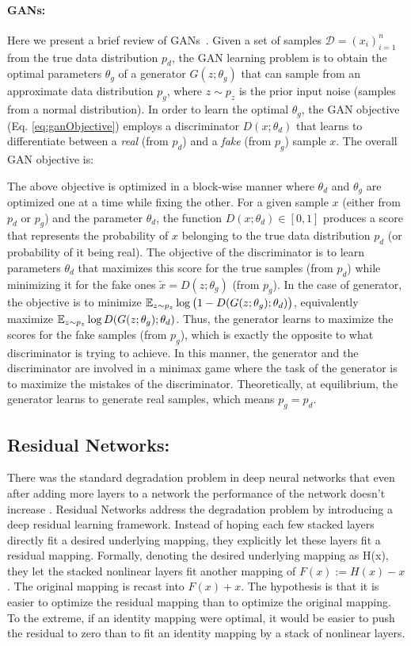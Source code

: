 \paragraph{GANs:} 
Here we present a brief review of GANs~\cite{goodfellow2014generative}. Given a set of samples $\mathcal{D} = (x_i)_{i=1}^n$ from the true data distribution $p_d$, the GAN learning problem is to obtain the optimal parameters $\theta_g$ of a generator $G(z;\theta_g)$ that can sample from an approximate data distribution $p_g$, where $z \sim p_z$ is the prior input noise (\eg samples from a normal distribution). In order to learn the optimal $\theta_g$, the GAN objective (Eq. \eqref{eq:ganObjective}) employs a discriminator $D(x; \theta_d)$ that learns to differentiate between a {\em real} (from $p_d$) and a {\em fake} (from $p_g$) sample $x$. The overall GAN objective is:


The above objective is optimized in a block-wise manner where $\theta_d$ and $\theta_g$ are optimized one at a time while fixing the other. For a given sample $x$ (either from $p_d$ or $p_g$) and the parameter $\theta_d$, the function $D(x; \theta_d) \in [0, 1]$ produces a score that represents the probability of $x$ belonging to the true data distribution $p_d$ (or probability of it being real). The objective of the discriminator is to learn parameters $\theta_d$ that maximizes this score for the true samples (from $p_d$) while minimizing it for the fake ones $\tilde{x} = D(z; \theta_g)$ (from $p_g$). In the case of generator, the objective is to minimize $\operatorname{\mathbb{E}}_{z \sim p_z}\log \big( 1 - D(G(z; \theta_g) ; \theta_d) \big)$, equivalently maximize $\operatorname{\mathbb{E}}_{z \sim p_z} \log D(G(z; \theta_g) ; \theta_d)$. Thus, the generator learns to maximize the scores for the fake samples (from $p_g$), which is exactly the opposite to what discriminator is trying to achieve. In this manner, the generator and the discriminator are involved in a minimax game where the task of the generator is to maximize the mistakes of the discriminator. Theoretically, at equilibrium, the generator learns to generate real samples, which means $p_g = p_d$.

\subsection*{Residual Networks:}
There was the standard degradation problem in deep neural networks that even after adding more layers to a network the performance of the network doesn't increase . Residual Networks\cite{he2016deep} address the degradation problem by introducing a deep residual learning framework. Instead of hoping each few stacked layers directly fit a desired underlying mapping, they explicitly let these layers fit a residual mapping. Formally, denoting the desired underlying mapping as H(x), they let the stacked nonlinear layers fit another mapping of $F(x):=H(x)-x$. The original mapping is recast into $F(x)+x$. The hypothesis is that it is easier to optimize the residual mapping than to optimize the original mapping. To the extreme, if an identity mapping were optimal, it would be easier to push the residual to zero than to fit an identity mapping by a stack of nonlinear layers.


